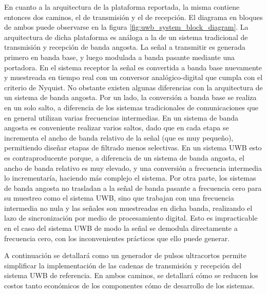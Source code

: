 En cuanto a la arquitectura de la plataforma reportada, la misma contiene
entonces dos caminos, el de transmisión y el de recepción. El diagrama en
bloques de ambos puede observarse en la figura
\ref{fig:uwb_system_block_diagram}.  La arquitectura de dicha plataforma es
análoga a la de un sistema tradicional de transmisión y recepción de banda
angosta. La señal a transmitir es generada primero en banda base, y luego
modulada a banda pasante mediante una portadora.  En el sistema receptor la
señal es convertida a banda base nuevamente y muestreada en tiempo real con un
conversor analógico-digital que cumpla con el criterio de Nyquist. No obstante
existen algunas diferencias con la arquitectura de un sistema de banda angosta.
Por un lado, la conversión a banda base se realiza en un solo salto, a
diferencia de los sistemas tradicionales de comunicaciones que en general
utilizan varias frecuencias intermedias. En un sistema de banda angosta es
conveniente realizar varios saltos, dado que en cada etapa se incrementa el ancho
de banda relativo de la señal (que es muy pequeño), permitiendo diseñar etapas
de filtrado menos selectivas. En un sistema UWB esto es contraproducente porque,
a diferencia de un sistema de banda angosta, el ancho de banda relativo es muy
elevado, y una conversión a frecuencia intermedia lo incrementaría, haciendo más
complejo el sistema. Por otra parte, los sistemas de banda angosta no trasladan
a la señal de banda pasante a frecuencia cero para su muestreo como el sistema
UWB, sino que trabajan con una frecuencia intermedia no nula y las señales son
muestreadas en dicha banda, realizando el lazo de sincronización por medio de
procesamiento digital. Esto es impracticable en el caso del sistema UWB de modo
la señal se demodula directamente a frecuencia cero, con los inconvenientes
prácticos que ello puede generar.

A continuación se detallará como un generador de pulsos ultracortos permite
simplificar la implementación de las cadenas de transmisión y recepción del
sistema UWB de referencia. En ambos caminos, se detallará cómo se reducen los
costos tanto económicos de los componentes cómo de desarrollo de los sistemas.

